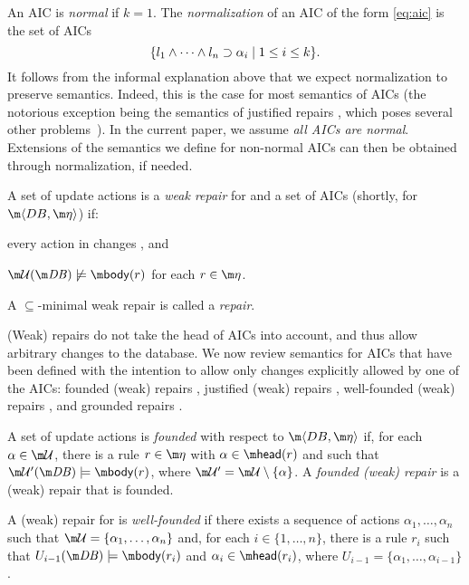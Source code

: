 An AIC is \emph{normal} if $k=1$. The \emph{normalization} of an AIC of the form \eqref{eq:aic} is the set of AICs 
\[\{l_1\land \dots\land l_n\supset \alpha_i\mid 1\leq i\leq k\}.\]
It follows from the informal explanation above that we expect normalization to preserve semantics. Indeed, this is the case for most semantics of AICs (the notorious exception being the semantics of justified repairs \cite{tplp/CaropreseT11}, which poses several other problems~\cite{tase/Cruz-FilipeEGN13}).
In the current paper, we assume \emph{all AICs are normal}. Extensions of the semantics we define for non-normal AICs can then be obtained through normalization, if needed.

\begin{definition}
 A set of update actions \UU is a \emph{weak repair} for \db and a set \aics of AICs (shortly, for $\fulldb$) if:
 \begin{compactitem}
  \item every action in \UU changes \db, and 
  \item $\UU(\db)\not\models \body(r)$ for each $r\in\aics$.
 \end{compactitem}
A $\subseteq$-minimal weak repair is called a \emph{repair}.
\end{definition}

(Weak) repairs do not take the head of AICs into account, and thus allow arbitrary changes to the database. We now review semantics for AICs that have been defined with the intention to allow only changes explicitly allowed by one of the AICs: founded (weak) repairs \cite{iclp/CaropreseGSZ06}, justified (weak) repairs \cite{tplp/CaropreseT11}, well-founded (weak) repairs \cite{tase/Cruz-FilipeEGN13}, and grounded repairs \cite{iclp/Cruz-Filipe16}.

\begin{definition}
 A set of update actions \UU is \emph{founded} with respect to $\fulldb$ if, for each $\alpha \in \UU$, there is a rule  $r\in \aics$ with $\alpha\in\head(r)$ and such that $\UU'(\db)\models \body(r)$, where $\UU'=\UU\setminus\{\alpha\}$. A \emph{founded (weak) repair} is a (weak) repair that is founded.
\end{definition}

\begin{definition}
 A (weak) repair \UU for \fulldb is \emph{well-founded} if there exists a sequence of actions $\alpha_1,\dots,\alpha_n$ such that $\UU=\{\alpha_1,\dots,\alpha_n\}$ and, for each $i\in\{1,\dots,n\}$, there is a rule $r_i$ such that $U_{i-1}(\db) \models \body (r_i)$ and $\alpha_i \in \head(r_i)$, where $U_{i-1} = \{\alpha_1,\dots,\alpha_{i-1}\}$.
\end{definition}

